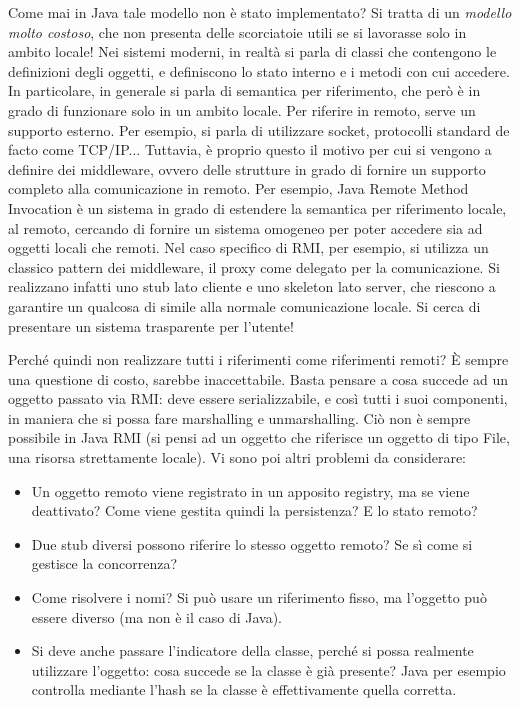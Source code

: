 Come mai in Java tale modello non è stato implementato? Si tratta di un \textit{modello molto costoso}, che non presenta
delle scorciatoie utili se si lavorasse solo in ambito locale!
Nei sistemi moderni, in realtà si parla di classi che contengono le definizioni degli oggetti, e definiscono lo stato
interno e i metodi con cui accedere. In particolare, in generale si parla di semantica per riferimento, che però è in
grado di funzionare solo in un ambito locale. Per riferire in remoto, serve un supporto esterno. Per esempio, si parla
di utilizzare socket, protocolli standard de facto come TCP/IP...
Tuttavia, è proprio questo il motivo per cui si vengono a definire dei middleware, ovvero delle strutture in grado di
fornire un supporto completo alla comunicazione in remoto. Per esempio, Java Remote Method Invocation è un sistema in
grado di estendere la semantica per riferimento locale, al remoto, cercando di fornire un sistema omogeneo per poter
accedere sia ad oggetti locali che remoti. Nel caso specifico di RMI, per esempio, si utilizza un classico pattern dei
middleware, il proxy come delegato per la comunicazione. Si realizzano infatti uno stub lato cliente e uno skeleton lato
server, che riescono a garantire un qualcosa di simile alla normale comunicazione locale. Si cerca di presentare
un sistema trasparente per l'utente!

Perché quindi non realizzare tutti i riferimenti come riferimenti remoti? È sempre una questione di costo, sarebbe
inaccettabile. Basta pensare a cosa succede ad un oggetto passato via RMI: deve essere serializzabile, e così tutti
i suoi componenti, in maniera che si possa fare marshalling e unmarshalling.
Ciò non è sempre possibile in Java RMI (si pensi ad un oggetto che riferisce un oggetto di tipo File, una risorsa
strettamente locale). Vi sono poi altri problemi da considerare:

\begin{itemize}
 \item Un oggetto remoto viene registrato in un apposito registry, ma se viene deattivato? Come viene gestita quindi 
 la persistenza? E lo stato remoto?
 \item Due stub diversi possono riferire lo stesso oggetto remoto? Se sì come si gestisce la concorrenza?
 \item Come risolvere i nomi? Si può usare un riferimento fisso, ma l'oggetto può essere diverso (ma non è il caso di
  Java).
 \item Si deve anche passare l'indicatore della classe, perché si possa realmente utilizzare l'oggetto: cosa succede
 se la classe è già presente? Java per esempio controlla mediante l'hash se la classe è effettivamente quella corretta.
\end{itemize}

